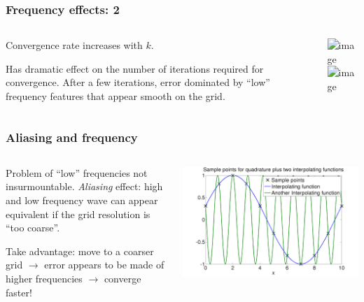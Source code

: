 \documentclass{beamer}
\begin{document}
\begin{frame}
  \frametitle{Frequency effects: 2}

  \begin{columns}
    \begin{column}{0.4\textwidth}
      Convergence rate increases with $k$. \pause

      \vspace{1ex}

      Has dramatic effect on the number of iterations required for
      convergence. After a few iterations, error dominated by ``low''
      frequency features that appear smooth on the grid.
    \end{column}
    \begin{column}{0.6\textwidth}
      \includegraphics<1|handout:0>[width=\textwidth]{figures/Smoothing2}
      \includegraphics<2-|handout:1>[width=\textwidth]{figures/Smoothing3}
    \end{column}
  \end{columns}

\end{frame}

\begin{frame}
  \frametitle{Aliasing and frequency}

  \begin{columns}
    \begin{column}{0.45\textwidth}
      Problem of ``low'' frequencies not
      insurmountable. \emph{Aliasing} effect: high and low frequency
      wave can appear equivalent if the grid resolution is ``too
      coarse''. \pause

      \vspace{1ex}

      Take advantage: move to a coarser grid $\rightarrow$ error
      appears to be made of higher frequencies $\rightarrow$ converge
      faster!
    \end{column}
    \begin{column}{0.54\textwidth}
      \includegraphics[width=\textwidth]{figures/QuadAliasing4}
    \end{column}
  \end{columns}

\end{frame}
\end{document}
